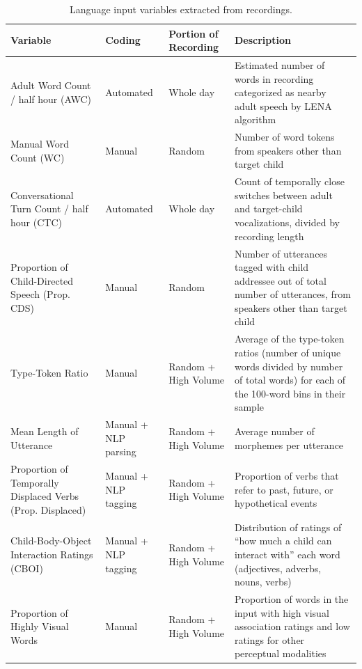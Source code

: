 \documentclass[
  man]{apa6}
\begin{document}
\begin{table}

\caption{\label{tab:variables-table}Language input variables extracted from recordings.}
\centering
\fontsize{9}{11}\selectfont
\begin{tabular}[t]{>{\raggedright\arraybackslash}p{1.4in}|>{\centering\arraybackslash}p{.8in}|>{\centering\arraybackslash}p{.75in}|>{\raggedright\arraybackslash}p{2.8in}}
\hline
Variable & Coding & Portion of Recording & Description\\
\hline
Adult Word Count / half hour (AWC) & Automated & Whole day & Estimated number of words in recording categorized as nearby adult speech by LENA algorithm\\
\hline
Manual Word Count (WC) & Manual & Random & Number of word tokens from speakers other than target child\\
\hline
Conversational Turn Count / half hour (CTC) & Automated & Whole day & Count of temporally close switches between adult and target-child vocalizations, divided by recording length\\
\hline
Proportion of Child-Directed Speech (Prop. CDS) & Manual & Random & Number of utterances tagged with child addressee out of total number of utterances, from speakers other than target child\\
\hline
Type-Token Ratio & Manual & Random + High Volume & Average of the type-token ratios (number of unique words divided by number of total words) for each of the 100-word bins in their sample\\
\hline
Mean Length of Utterance & Manual + NLP parsing & Random + High Volume & Average number of morphemes per utterance\\
\hline
Proportion of Temporally Displaced Verbs (Prop. Displaced) & Manual + NLP tagging & Random + High Volume & Proportion of verbs that refer to past, future, or hypothetical events\\
\hline
Child-Body-Object Interaction Ratings (CBOI) & Manual + NLP tagging & Random + High Volume & Distribution of ratings of “how much a child can interact with” each word (adjectives, adverbs, nouns, verbs)\\
\hline
Proportion of Highly Visual Words & Manual & Random + High Volume & Proportion of words in the input with high visual association ratings and low ratings for other perceptual modalities\\
\hline
\end{tabular}
\end{table}
\end{document}
